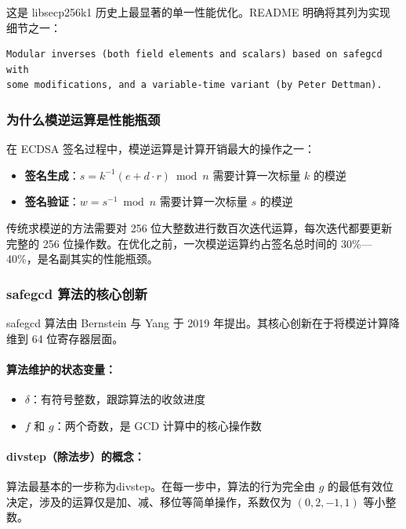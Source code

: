 \documentclass[a4paper,12pt]{ctexart}
\begin{document}
这是 libsecp256k1 历史上最显著的单一性能优化。README 明确将其列为实现细节之一：

\begin{codebox}
\begin{verbatim}
Modular inverses (both field elements and scalars) based on safegcd with
some modifications, and a variable-time variant (by Peter Dettman).
\end{verbatim}
\end{codebox}

\subsubsection{为什么模逆运算是性能瓶颈}

在 ECDSA 签名过程中，模逆运算是计算开销最大的操作之一：

\begin{itemize}[leftmargin=*]
  \item \textbf{签名生成}：$s = k^{-1}(e + d \cdot r) \bmod n$ 需要计算一次标量 $k$ 的模逆
  \item \textbf{签名验证}：$w = s^{-1} \bmod n$ 需要计算一次标量 $s$ 的模逆
\end{itemize}

传统求模逆的方法需要对 256 位大整数进行数百次迭代运算，每次迭代都要更新完整的 256 位操作数。在优化之前，一次模逆运算约占签名总时间的 30\%—40\%，是名副其实的性能瓶颈。

\subsubsection{safegcd 算法的核心创新}

safegcd 算法由 Bernstein 与 Yang 于 2019 年提出。其核心创新在于将模逆计算降维到 64 位寄存器层面。

\paragraph{算法维护的状态变量：}
\begin{itemize}[leftmargin=*]
  \item $\delta$：有符号整数，跟踪算法的收敛进度
  \item $f$ 和 $g$：两个奇数，是 GCD 计算中的核心操作数
\end{itemize}

\paragraph{divstep（除法步）的概念：}
算法最基本的一步称为divstep。在每一步中，算法的行为完全由 $g$ 的最低有效位决定，涉及的运算仅是加、减、移位等简单操作，系数仅为 $(0, 2, -1, 1)$ 等小整数。
\end{document}
